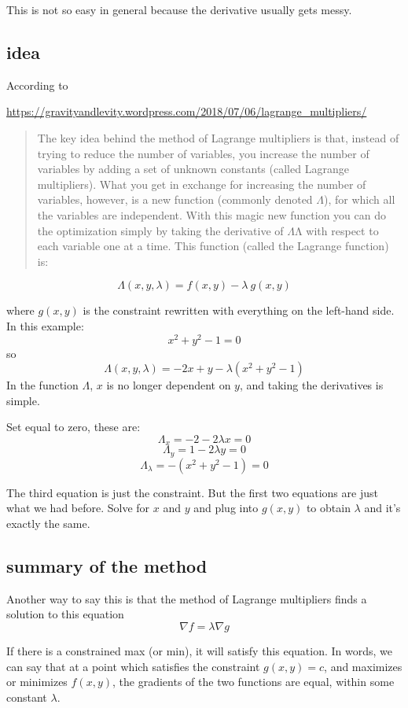 \documentclass[11pt, oneside]{article}
\begin{document}
This is not so easy in general because the derivative usually gets messy.

\subsection*{idea}
According to 

\url{https://gravityandlevity.wordpress.com/2018/07/06/lagrange_multipliers/}

\begin{quote} The key idea behind the method of Lagrange multipliers is that, instead of trying to reduce the number of variables, you increase the number of variables by adding a set of unknown constants (called Lagrange multipliers). What you get in exchange for increasing the number of variables, however, is a new function (commonly denoted $\Lambda$), for which all the variables are independent. With this magic new function you can do the optimization simply by taking the derivative of $\Lambda$Λ with respect to each variable one at a time. This function (called the Lagrange function) is:\end{quote}

\[ \Lambda(x,y,\lambda) = f(x,y) - \lambda \ g(x,y) \]

where $g(x,y)$ is the constraint rewritten with everything on the left-hand side.  In this example:
\[ x^2 + y^2 - 1 = 0 \]
so
\[ \Lambda(x,y,\lambda) = -2x + y - \lambda (x^2 + y^2 - 1) \]
In the function $\Lambda$, $x$ is no longer dependent on $y$, and taking the derivatives is simple.

Set equal to zero, these are:
\[ \Lambda_x = -2 - 2\lambda x = 0 \]
\[ \Lambda_y = 1 - 2\lambda y = 0 \]
\[ \Lambda_\lambda = - (x^2 + y^2 - 1) = 0 \]

The third equation is just the constraint.  But the first two equations are just what we had before.  Solve for $x$ and $y$ and plug into $g(x,y)$ to obtain $\lambda$ and it's exactly the same.

\subsection*{summary of the method}

Another way to say this is that the method of Lagrange multipliers finds a solution to this equation
\[ \nabla f = \lambda \nabla g \]

If there is a constrained max (or min), it will satisfy this equation.  In words, we can say that at a point which satisfies the constraint $g(x,y) = c$, and maximizes or minimizes $f(x,y)$, the gradients of the two functions are equal, within some constant $\lambda$. 
\end{document}
